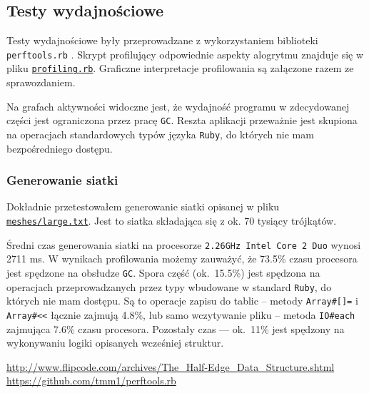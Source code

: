 \documentclass[10pt,a4paper]{article}
\newcommand{\f}[1]{\texttt{#1}}
\newcommand{\rev}{754330aa66a33e7434e6bda5c083aa3e12b7b65f}
\newcommand{\revhref}[1] {\href{https://github.com/student-tomasz/aisd-projekt-indywidualny/blob/\rev/#1}{\f{#1}}}
\begin{document}
\subsection{Testy wydajnościowe}

Testy wydajnościowe były przeprowadzane z wykorzystaniem biblioteki
\f{perftools.rb} \cite{perftools}. Skrypt profilujący odpowiednie aspekty
alogrytmu znajduje się w pliku \revhref{profiling.rb}. Graficzne interpretacje
profilowania są załączone razem ze sprawozdaniem.

Na grafach aktywności widoczne jest, że wydajność programu w zdecydowanej
części jest ograniczona przez pracę \f{GC}. Reszta aplikacji przeważnie jest
skupiona na operacjach standardowych typów języka \f{Ruby}, do których nie mam
bezpośredniego dostępu.

\subsubsection{Generowanie siatki}

Dokładnie przetestowałem generowanie siatki opisanej w pliku
\revhref{meshes/large.txt}. Jest to siatka składająca się z ok. 70 tysiący
trójkątów.

Średni czas generowania siatki na procesorze \f{2.26GHz Intel Core 2 Duo}
wynosi 2711 ms. W wynikach profilowania możemy zauważyć, że 73.5\% czasu
procesora jest spędzone na obsłudze \f{GC}. Spora część (ok.~15.5\%) jest
spędzona na operacjach przeprowadzanych przez typy wbudowane w standard
\f{Ruby}, do których nie mam dostępu. Są to operacje zapisu do tablic --
metody \f{Array\#[]=} i \f{Array\#<<} łącznie zajmują 4.8\%, lub samo
wczytywanie pliku -- metoda \f{IO\#each} zajmująca 7.6\% czasu procesora.
Pozostały czas --- ok.~11\% jest spędzony na wykonywaniu logiki opisanych
wcześniej struktur.



\begin{thebibliography}{9}
    \url{http://www.flipcode.com/archives/The_Half-Edge_Data_Structure.shtml}
    \url{https://github.com/tmm1/perftools.rb}
\end{thebibliography}
\end{document}
